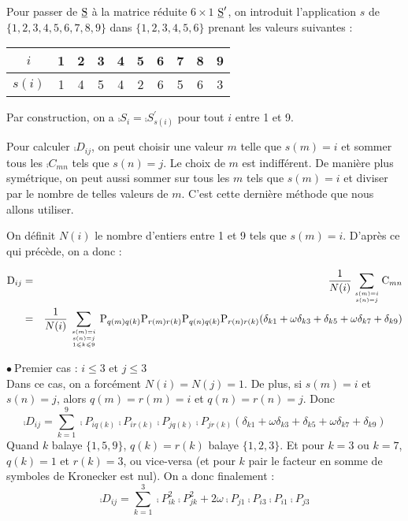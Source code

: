Pour passer de $\underline{\textrm{S}}$ \`a la matrice r\'eduite $6\times 1$ $\underline{\textrm{S}}^\prime$,
on introduit l'application $s$ de $\{1,2,3,4,5,6,7,8,9\}$ dans 
$\{1,2,3,4,5,6\}$ prenant les valeurs suivantes :
\begin{center}
\begin{tabular}{|c|c|c|c|c|c|c|c|c|c|}
\hline
$i$&1&2&3&4&5&6&7&8&9\\
\hline
$s(i)$&1&4&5&4&2&6&5&6&3\\
\hline
\end{tabular}
\end{center}
Par construction, on a $\comp{S}_i=\comp{S}^\prime_{s(i)}$ pour tout $i$ entre 1
et 9.

Pour calculer $\comp{D}_{ij}$, on peut choisir une valeur $m$ telle que 
$s(m)=i$ et sommer tous les $\comp{C}_{mn}$ tels que $s(n)=j$. Le choix de $m$
est indiff\'erent. De mani\`ere plus sym\'etrique, on peut aussi sommer sur tous 
les $m$ tels que $s(m)=i$ et diviser par le nombre de telles valeurs de $m$. C'est 
cette derni\`ere m\'ethode que nous allons utiliser.

On d\'efinit $N(i)$ le nombre d'entiers entre 1 et 9 tels que
$s(m)=i$. D'apr\`es ce qui pr\'ec\`ede, on a donc :

\begin{eqnarray}
\textrm{D}_{ij}&=&\frac{1}{N(i)}\sum_{s(m)=i \atop s(n)=j}\textrm{C}_{mn}\nonumber\\
&=&\frac{1}{N(i)}\sum_{{s(m)=i \atop s(n)=j}\atop 1\leqslant k\leqslant 9}
\textrm{P}_{q(m)q(k)}\textrm{P}_{r(m)r(k)}\textrm{P}_{q(n)q(k)}\textrm{P}_{r(n)r(k)}
(\delta_{k1}+\omega\delta_{k3}+\delta_{k5}+\omega\delta_{k7}+\delta_{k9})
\end{eqnarray}

\vspace{1cm}
$\bullet\ ${\sc Premier cas} : $i\leqslant 3$ et $j\leqslant 3$\\
Dans ce cas, on a forc\'ement $N(i)=N(j)=1$. De plus, si $s(m)=i$ et $s(n)=j$,
alors $q(m)=r(m)=i$ et $q(n)=r(n)=j$. Donc \\
\begin{equation}
\comp{D}_{ij}=\sum_{k=1}^9
\comp{P}_{iq(k)}\comp{P}_{ir(k)}\comp{P}_{jq(k)}\comp{P}_{jr(k)}
(\delta_{k1}+\omega\delta_{k3}+\delta_{k5}+\omega\delta_{k7}+\delta_{k9})
\end{equation}
Quand $k$ balaye $\{1,5,9\}$, $q(k)=r(k)$ balaye $\{1,2,3\}$. Et pour $k=3$ ou
$k=7$, $q(k)=1$ et $r(k)=3$, ou vice-versa (et pour $k$ pair le facteur en somme 
de symboles de Kronecker est nul). On a donc finalement :
\begin{equation}
\comp{D}_{ij}=\sum_{k=1}^3\comp{P}_{ik}^2\comp{P}_{jk}^2
+2\omega\comp{P}_{j1}\comp{P}_{i3}\comp{P}_{i1}\comp{P}_{j3}
\end{equation}

